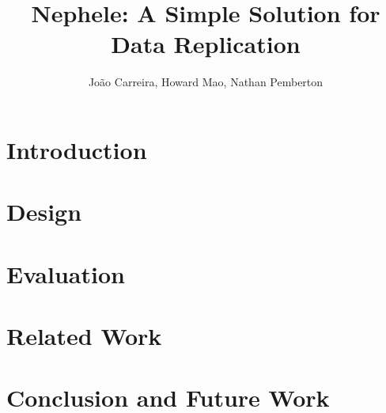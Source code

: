 \documentclass[10pt,twocolumn]{article}
\begin{document}
\title{{\bf Nephele: A Simple Solution for Data Replication}}
\author{
    Jo\~{a}o Carreira, Howard Mao, Nathan Pemberton
}
\maketitle

\graphicspath{{../figures/}}

\begin{abstract}

\end{abstract}

\section{Introduction}

\section{Design}

\section{Evaluation}

\section{Related Work}


\section{Conclusion and Future Work}
\label{sec:conclusion}


{}

\end{document}
